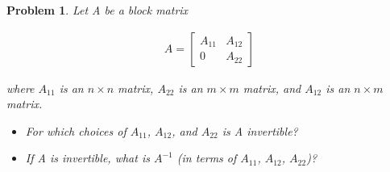 \documentclass{article}
\newtheorem{problem}{Problem}
\begin{document}
\begin{problem}
Let A be a block matrix

\begin{align*}
A = \begin{bmatrix} A_{11} & A_{12} \\ 0 & A_{22} \end{bmatrix}
\end{align*}

where $A_{11}$ is an $n \times n$ matrix, $A_{22}$ is an $m \times m$ matrix, and $A_{12}$ is an $n \times m$ matrix. \\

\begin{itemize}
\item For which choices of $A_{11}$, $A_{12}$, and $A_{22}$ is A invertible?
\item If A is invertible, what is $A^{-1}$ (in terms of $A_{11}$, $A_{12}$, $A_{22}$)?
\end{itemize}

\end{problem}
\end{document}

